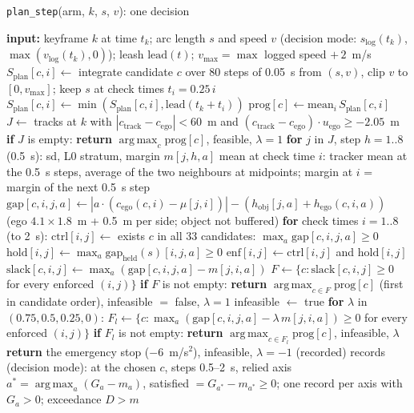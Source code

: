 \documentclass{ieeeaccess}
\newcommand{\AlgInd}{\hspace*{1.2em}}
\begin{document}
\begin{algorithm*}[!t]
\caption{One decision of the planner.}
\label{alg:2}
\begin{algorithmic}[1]
\item[] \texttt{plan\_step}(arm, $k$, $s$, $v$): one decision
\item[] \textbf{input:} keyframe $k$ at time $t_k$; arc length $s$ and speed $v$ (decision mode: $s_{\mathrm{log}}(t_k)$, $\max(v_{\mathrm{log}}(t_k), 0)$); leash $\mathrm{lead}(t)$; $v_{\max} = \max$ logged speed $+\,2$~m/s
\STATE $S_{\mathrm{plan}}[c, i] \gets$ integrate candidate $c$ over 80 steps of 0.05~s from $(s, v)$, clip $v$ to $[0, v_{\max}]$; keep $s$ at check times $t_i = 0.25\,i$
\STATE $S_{\mathrm{plan}}[c, i] \gets \min(S_{\mathrm{plan}}[c, i], \mathrm{lead}(t_k + t_i))$ 
\STATE $\mathrm{prog}[c] \gets \mathrm{mean}_i\, S_{\mathrm{plan}}[c, i]$ 
\STATE $J \gets$ tracks at $k$ with $|c_{\mathrm{track}} - c_{\mathrm{ego}}| < 60$~m and $(c_{\mathrm{track}} - c_{\mathrm{ego}}) \cdot u_{\mathrm{ego}} \geq -2.05$~m
\STATE \textbf{if} $J$ is empty: \textbf{return} $\operatorname*{arg\,max}_c \mathrm{prog}[c]$, feasible, $\lambda = 1$
\STATE \textbf{for} $j$ in $J$, step $h = 1..8$ (0.5~s): sd, L0 stratum, margin $m[j, h, a]$
\STATE mean at check time $i$: tracker mean at the 0.5~s steps, average of the two neighbours at midpoints; margin at $i$ = margin of the next 0.5~s step
\STATE $\mathrm{gap}[c, i, j, a] \gets |a \cdot (c_{\mathrm{ego}}(c, i) - \mu[j, i])| - (h_{\mathrm{obj}}[j, a] + h_{\mathrm{ego}}(c, i, a))$ (ego $4.1 \times 1.8$~m + 0.5~m per side; object not buffered)
\STATE \textbf{for} check times $i = 1..8$ (to 2~s):
\STATE \AlgInd $\mathrm{ctrl}[i, j] \gets$ exists $c$ in all 33 candidates: $\max_a \mathrm{gap}[c, i, j, a] \geq 0$
\STATE \AlgInd $\mathrm{hold}[i, j] \gets \max_a \mathrm{gap}_{\mathrm{held}}(s)[i, j, a] \geq 0$ 
\STATE \AlgInd $\mathrm{enf}[i, j] \gets \mathrm{ctrl}[i, j]$ and $\mathrm{hold}[i, j]$ 
\STATE $\mathrm{slack}[c, i, j] \gets \max_a (\mathrm{gap}[c, i, j, a] - m[j, i, a])$
\STATE $F \gets \{c : \mathrm{slack}[c, i, j] \geq 0$ for every enforced $(i, j)\}$
\STATE \textbf{if} $F$ is not empty: \textbf{return} $\operatorname*{arg\,max}_{c \in F} \mathrm{prog}[c]$ (first in candidate order), infeasible $=$ false, $\lambda = 1$
\STATE infeasible $\gets$ true
\STATE \textbf{for} $\lambda$ in $(0.75, 0.5, 0.25, 0)$:
\STATE \AlgInd $F_l \gets \{c : \max_a (\mathrm{gap}[c, i, j, a] - \lambda\, m[j, i, a]) \geq 0$ for every enforced $(i, j)\}$ 
\STATE \AlgInd \textbf{if} $F_l$ is not empty: \textbf{return} $\operatorname*{arg\,max}_{c \in F_l} \mathrm{prog}[c]$, infeasible, $\lambda$
\STATE \textbf{return} the emergency stop ($-6$~m/s$^{2}$), infeasible, $\lambda = -1$ (recorded)
\STATE records (decision mode): at the chosen $c$, steps 0.5--2~s, relied axis $a^{*} = \operatorname*{arg\,max}_a (G_a - m_a)$, satisfied $= G_{a^{*}} - m_{a^{*}} \geq 0$; one record per axis with $G_a > 0$; exceedance $D > m$
\end{algorithmic}
\end{algorithm*}
\end{document}
